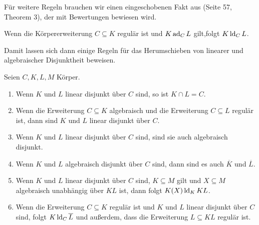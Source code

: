     Für weitere Regeln brauchen wir einen eingeschobenen Fakt aus \cite{SergeLang} (Seite 57, Theorem 3), der mit Bewertungen bewiesen wird.
    \begin{fact}\label{Das komplizierte Lemma}
    	Wenn die Körpererweiterung $C\subseteq K$ regulär ist und $K\operatorname{ad}_CL$ gilt,\linebreak folgt $K\operatorname{ld}_CL$.
    \end{fact}
    
    Damit lassen sich dann einige Regeln für das \glqq{}Herumschieben\grqq{} von linearer und algebraischer Disjunktheit beweisen.\newpage
    \begin{lemma}\label{Rechenregeln}
    	Seien $C,K,L,M$ Körper.
    	\begin{enumerate}
    		\item Wenn $K$ und $L$ linear disjunkt über $C$ sind, so ist $K\cap L=C$.
    		\item Wenn die Erweiterung $C\subseteq K$ algebraisch und die Erweiterung $C\subseteq L$ regulär ist, dann sind $K$ und $L$ linear disjunkt über $C$.
    		\item Wenn $K$ und $L$ linear disjunkt über $C$ sind, sind sie auch algebraisch disjunkt.
    		\item Wenn $K$ und $L$ algebraisch disjunkt über $C$ sind, dann sind es auch $\overline{K}$ und $\overline{L}$.
    		\item Wenn $K$ und $L$ linear disjunkt über $C$ sind, $K\subseteq M$ gilt und $X\subseteq M$ algebraisch unabhängig über $KL$ ist, dann folgt $K(X)\operatorname{ld}_KKL$.
    		\item Wenn die Erweiterung $C\subseteq K$ regulär ist und $K$ und $L$ linear disjunkt über $C$ sind, folgt $K\operatorname{ld}_C\overline{L}$ und außerdem, dass die Erweiterung $L\subseteq KL$ regulär ist.
    	\end{enumerate}
    \end{lemma}
